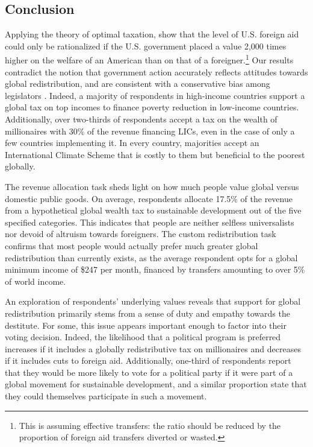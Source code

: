 \documentclass[12pt,english]{article}
\begin{document}
\begin{bibunit}
\section{Conclusion}

Applying the theory of optimal taxation, \cite{kopczuk_limitations_2005} show that the level of U.S. foreign aid could only be rationalized if the U.S. government placed a value 2,000 times higher on the welfare of an American than on that of a foreigner.\footnote{This is assuming effective transfers: the ratio should be reduced by the proportion of foreign aid transfers diverted or wasted.}
Our results contradict the notion that government action accurately reflects attitudes towards global redistribution, and are consistent with a conservative bias among legislators \citep{gilens_testing_2014,broockman_bias_2018,pilet_politicians_2024}.
Indeed, a majority of respondents in high-income countries support a global tax on top incomes to finance poverty reduction in low-income countries. Additionally, over two-thirds of respondents accept a tax on the wealth of millionaires with 30\% of the revenue financing LICs, even in the case of only a few countries implementing it. In every country, majorities accept an International Climate Scheme that is costly to them but beneficial to the poorest globally.

The revenue allocation task sheds light on how much people value global versus domestic public goods. On average, respondents allocate 17.5\% of the revenue from a hypothetical global wealth tax to sustainable development out of the five specified categories.
This indicates that people are neither selfless universalists %
nor devoid of altruism towards foreigners.
The custom redistribution task confirms that most people would actually prefer much greater global redistribution than currently exists, as the average respondent opts for a global minimum income of \$247 per month, financed by transfers amounting to over 5\% of world income.

An exploration of respondents' underlying values reveals that support for global redistribution primarily stems from a sense of duty and empathy towards the destitute. For some, this issue appears important enough to factor into their voting decision. Indeed, the likelihood that a political program is preferred increases if it includes a globally redistributive tax on millionaires and decreases if it includes cuts to foreign aid. Additionally, one-third of respondents report that they would be more likely to vote for a political party if it were part of a global movement for sustainable development, and a similar proportion state that they could themselves participate in such a movement.


\end{bibunit}
\end{document}
